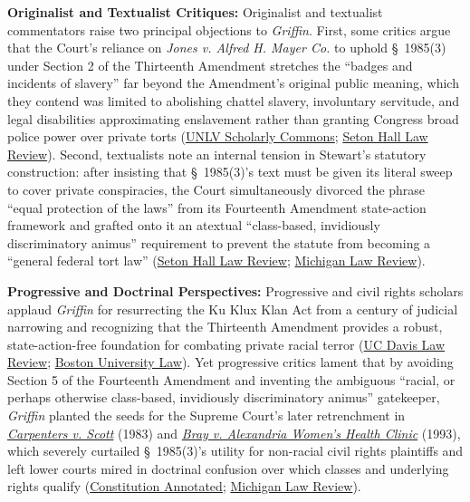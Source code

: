 \documentclass[12pt]{article}
\begin{document}
\textbf{Originalist and Textualist Critiques:} Originalist and textualist commentators raise two principal objections to \textit{Griffin}. First, some critics argue that the Court's reliance on \textit{Jones v. Alfred H. Mayer Co.} to uphold \S~1985(3) under Section 2 of the Thirteenth Amendment stretches the ``badges and incidents of slavery'' far beyond the Amendment's original public meaning, which they contend was limited to abolishing chattel slavery, involuntary servitude, and legal disabilities approximating enslavement rather than granting Congress broad police power over private torts (\href{https://scholars.law.unlv.edu/cgi/viewcontent.cgi?article=1013&context=amend13_bi}{UNLV Scholarly Commons}; \href{https://scholarship.shu.edu/cgi/viewcontent.cgi?article=1935&context=shlr}{Seton Hall Law Review}). Second, textualists note an internal tension in Stewart's statutory construction: after insisting that \S~1985(3)'s text must be given its literal sweep to cover private conspiracies, the Court simultaneously divorced the phrase ``equal protection of the laws'' from its Fourteenth Amendment state-action framework and grafted onto it an atextual ``class-based, invidiously discriminatory animus'' requirement to prevent the statute from becoming a ``general federal tort law'' (\href{https://scholarship.shu.edu/cgi/viewcontent.cgi?article=1935&context=shlr}{Seton Hall Law Review}; \href{https://repository.law.umich.edu/cgi/viewcontent.cgi?article=2822&context=mlr}{Michigan Law Review}).

\textbf{Progressive and Doctrinal Perspectives:} Progressive and civil rights scholars applaud \textit{Griffin} for resurrecting the Ku Klux Klan Act from a century of judicial narrowing and recognizing that the Thirteenth Amendment provides a robust, state-action-free foundation for combating private racial terror (\href{https://lawreview.law.ucdavis.edu/sites/g/files/dgvnsk15026/files/media/documents/DavisVol40No4_Carter.pdf}{UC Davis Law Review}; \href{https://scholarship.law.bu.edu/cgi/viewcontent.cgi?article=3274&context=faculty_scholarship}{Boston University Law}). Yet progressive critics lament that by avoiding Section 5 of the Fourteenth Amendment and inventing the ambiguous ``racial, or perhaps otherwise class-based, invidiously discriminatory animus'' gatekeeper, \textit{Griffin} planted the seeds for the Supreme Court's later retrenchment in \href{https://caselaw.findlaw.com/court/us-supreme-court/463/825.html}{\textit{Carpenters v. Scott}} (1983) and \href{https://supreme.justia.com/cases/federal/us/506/263/}{\textit{Bray v. Alexandria Women's Health Clinic}} (1993), which severely curtailed \S~1985(3)'s utility for non-racial civil rights plaintiffs and left lower courts mired in doctrinal confusion over which classes and underlying rights qualify (\href{https://constitution.congress.gov/browse/essay/amdt14-S5-2/ALDE_00000851/}{Constitution Annotated}; \href{https://repository.law.umich.edu/cgi/viewcontent.cgi?article=2822&context=mlr}{Michigan Law Review}).
\end{document}
